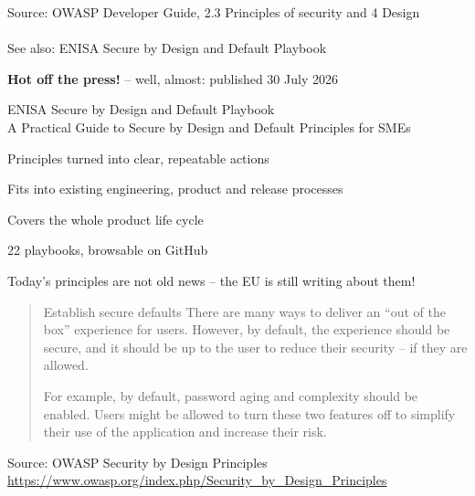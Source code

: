 \documentclass[Screen16to9,17pt]{foils}
\begin{document}
Source: OWASP Developer Guide, 2.3 Principles of security and 4 Design\\
{\footnotesize{}}\\
See also: ENISA Secure by Design and Default Playbook



{\bfseries\Large Hot off the press!} -- well, almost: published 30 July 2026

\begin{list1}
\item ENISA Secure by Design and Default Playbook\\
A Practical Guide to Secure by Design and Default Principles for SMEs
\begin{list2}
\item Principles turned into clear, repeatable actions
\item Fits into existing engineering, product and release processes
\item Covers the whole product life cycle
\item 22 playbooks, browsable on GitHub
\end{list2}
\item {\footnotesize{}}
\item {\footnotesize{}}
\end{list1}

Today's principles are not old news -- the EU is still writing about them!



\begin{quote}
Establish secure defaults
There are many ways to deliver an “out of the box” experience for users. However, by default, the experience should be secure, and it should be up to the user to reduce their security – if they are allowed.

For example, by default, password aging and complexity should be enabled. Users might be allowed to turn these two features off to simplify their use of the application and increase their risk.
\end{quote}

Source: OWASP Security by Design Principles\\
\url{https://www.owasp.org/index.php/Security_by_Design_Principles}
\end{document}
